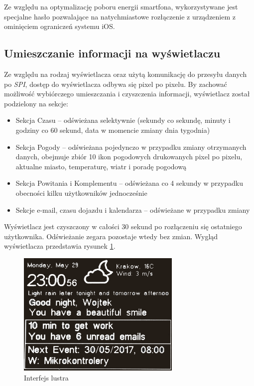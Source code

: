 \documentclass[a4paper,11pt]{article}
\begin{document}
Ze względu na optymalizację poboru energii smartfona, wykorzystywane jest specjalne hasło pozwalające na natychmiastowe rozłączenie z urządzeniem z ominięciem ograniczeń systemu iOS.

\subsection{Umieszczanie informacji na wyświetlaczu}
Ze względu na rodzaj wyświetlacza oraz użytą komunikację do przesyłu danych po \textit{SPI}, dostęp do wyświetlacza odbywa się pixel po pixelu. By zachować możliwość wybiórczego umieszczania i czyszczenia informacji, wyświetlacz został podzielony na sekcje:
\begin{itemize}
	\item Sekcja Czasu -- odświeżana selektywnie (sekundy co sekundę, minuty i godziny co 60 sekund, data w momencie zmiany dnia tygodnia)
	\item Sekcja Pogody -- odświeżana pojedynczo w przypadku zmiany otrzymanych danych, obejmuje zbiór 10 ikon pogodowych drukowanych pixel po pixelu, aktualne miasto, temperaturę, wiatr i poradę pogodową
	\item Sekcja Powitania i Komplementu -- odświeżana co 4 sekundy w przypadku obecności kilku użytkowników jednocześnie
	\item Sekcje e-mail, czasu dojazdu i kalendarza -- odświeżane w przypadku zmiany	
\end{itemize}

Wyświetlacz jest czyszczony w całości 30 sekund po rozłączeniu się ostatniego użytkownika. Odświeżanie zegara pozostaje wtedy bez zmian. Wygląd wyświetlacza przedstawia rysunek \ref{nrf_interface}.

\begin{figure}[H]
	\includegraphics[width=0.7\textwidth,center]{nrf_interface}
	\caption {Interfejs lustra}
	\label{nrf_interface}
\end{figure}
\end{document}
